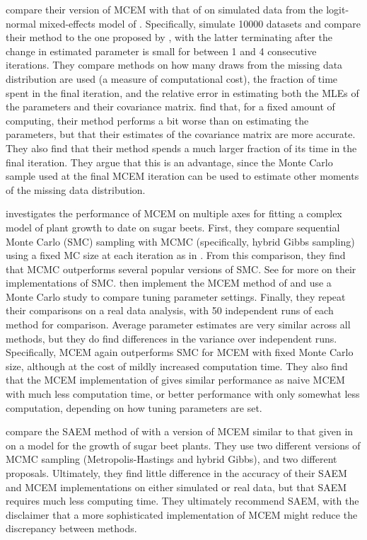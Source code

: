\documentclass[11pt, oneside]{article}   	%
\begin{document}
\citet{Caf05} compare their version of MCEM with that of \citet{Boo99} on simulated data from the logit-normal mixed-effects model of \citet{McC97}. Specifically, \citeauthor{Caf05} simulate 10000 datasets and compare their method to the one proposed by \citet{Boo99}, with the latter terminating after the change in estimated parameter is small for between 1 and 4 consecutive iterations. They compare methods on how many draws from the missing data distribution are used (a measure of computational cost), the fraction of time spent in the final iteration, and the relative error in estimating both the MLEs of the parameters and their covariance matrix. \citeauthor{Caf05} find that, for a fixed amount of computing, their method performs a bit worse than \citet{Boo99} on estimating the parameters, but that their estimates of the covariance matrix are more accurate. They also find that their method spends a much larger fraction of its time in the final iteration. They argue that this is an advantage, since the Monte Carlo sample used at the final MCEM iteration can be used to estimate other moments of the missing data distribution.

\citet{Tre14} investigates the performance of MCEM on multiple axes for fitting a complex model of plant growth to date on sugar beets. First, they compare sequential Monte Carlo (SMC) sampling with MCMC (specifically, hybrid Gibbs sampling) using a fixed MC size at each iteration as in \citet{Wei90}. From this comparison, they find that MCMC outperforms several popular versions of SMC. See \citet{Tre13} for more on their implementations of SMC. \citeauthor{Tre14} then implement the MCEM method of \citet{Caf05} and use a Monte Carlo study to compare tuning parameter settings. Finally, they repeat their comparisons on a real data analysis, with 50 independent runs of each method for comparison. Average parameter estimates are very similar across all methods, but they do find differences in the variance over independent runs. Specifically, MCEM again outperforms SMC for MCEM with fixed Monte Carlo size, although at the cost of mildly increased computation time. They also find that the MCEM implementation of \citet{Caf05} gives similar performance as naive MCEM with much less computation time, or better performance with only somewhat less computation, depending on how tuning parameters are set.

\citet{Bae16} compare the SAEM method of \citet{Del99} with a version of MCEM similar to that given in \citet{McC97} on a model for the growth of sugar beet plants. They use two different versions of MCMC sampling (Metropolis-Hastings and hybrid Gibbs), and two different proposals. Ultimately, they find little difference in the accuracy of their SAEM and MCEM implementations on either simulated or real data, but that SAEM requires much less computing time. They ultimately recommend SAEM, with the disclaimer that a more sophisticated implementation of MCEM \citep[e.g.,][]{Caf05,Boo99} might reduce the discrepancy between methods.
\end{document}
